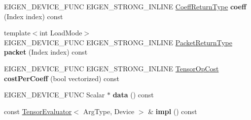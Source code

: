 \begin{DoxyCompactItemize}
E\+I\+G\+E\+N\+\_\+\+D\+E\+V\+I\+C\+E\+\_\+\+F\+U\+NC E\+I\+G\+E\+N\+\_\+\+S\+T\+R\+O\+N\+G\+\_\+\+I\+N\+L\+I\+NE \hyperlink{group___sparse_core___module}{Coeff\+Return\+Type} {\bfseries coeff} (Index index) const
\item 
\mbox{\label{struct_eigen_1_1_tensor_evaluator_3_01const_01_tensor_layout_swap_op_3_01_arg_type_01_4_00_01_device_01_4_a4ddc0df3edf1505efd91f3118b2449c9}} 
{\footnotesize template$<$int Load\+Mode$>$ }\\E\+I\+G\+E\+N\+\_\+\+D\+E\+V\+I\+C\+E\+\_\+\+F\+U\+NC E\+I\+G\+E\+N\+\_\+\+S\+T\+R\+O\+N\+G\+\_\+\+I\+N\+L\+I\+NE \hyperlink{group___sparse_core___module}{Packet\+Return\+Type} {\bfseries packet} (Index index) const
\item 
\mbox{\label{struct_eigen_1_1_tensor_evaluator_3_01const_01_tensor_layout_swap_op_3_01_arg_type_01_4_00_01_device_01_4_a6c02ab457bd164d7e03536af52919a2d}} 
E\+I\+G\+E\+N\+\_\+\+D\+E\+V\+I\+C\+E\+\_\+\+F\+U\+NC E\+I\+G\+E\+N\+\_\+\+S\+T\+R\+O\+N\+G\+\_\+\+I\+N\+L\+I\+NE \hyperlink{class_eigen_1_1_tensor_op_cost}{Tensor\+Op\+Cost} {\bfseries cost\+Per\+Coeff} (bool vectorized) const
\item 
\mbox{\label{struct_eigen_1_1_tensor_evaluator_3_01const_01_tensor_layout_swap_op_3_01_arg_type_01_4_00_01_device_01_4_a96410830886fe5f423e6543a2724387f}} 
E\+I\+G\+E\+N\+\_\+\+D\+E\+V\+I\+C\+E\+\_\+\+F\+U\+NC Scalar $\ast$ {\bfseries data} () const
\item 
\mbox{\label{struct_eigen_1_1_tensor_evaluator_3_01const_01_tensor_layout_swap_op_3_01_arg_type_01_4_00_01_device_01_4_abce09b02620cba0bca96f72d35189f5c}} 
const \hyperlink{struct_eigen_1_1_tensor_evaluator}{Tensor\+Evaluator}$<$ Arg\+Type, Device $>$ \& {\bfseries impl} () const
\item 
\mbox{\label{struct_eigen_1_1_tensor_evaluator_3_01const_01_tensor_layout_swap_op_3_01_arg_type_01_4_00_01_device_01_4_a1631e9fa03a6697d3c1a00eeed654fa0}} 

\end{DoxyCompactItemize}
